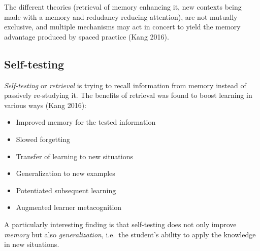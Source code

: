 The different theories (retrieval of memory enhancing it, new contexts
being made with a memory and redudancy reducing attention), are not
mutually exclusive, and multiple mechanisms may act in concert to yield
the memory advantage produced by spaced practice (Kang 2016).

\hypertarget{self-testing}{\subsection{Self-testing}\label{self-testing}}

\emph{Self-testing} or \emph{retrieval} is trying to recall information
from memory instead of passively re-studying it. The benefits of
retrieval was found to boost learning in various ways (Kang 2016):

\begin{itemize}
\tightlist
\item
  Improved memory for the tested information
\item
  Slowed forgetting
\item
  Transfer of learning to new situations
\item
  Generalization to new examples
\item
  Potentiated subsequent learning
\item
  Augmented learner metacognition
\end{itemize}

A particularly interesting finding is that self-testing does not only
improve \emph{memory} but also \emph{generalization}, i.e.~the student's
ability to apply the knowledge in new situations.

